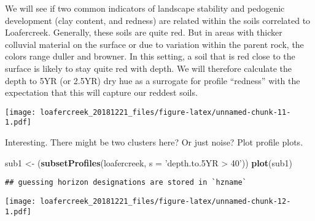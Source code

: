 \documentclass[]{article}
\newenvironment{Shaded}{\begin{snugshade}}{\end{snugshade}}
\newcommand{\KeywordTok}[1]{\textcolor[rgb]{0.13,0.29,0.53}{\textbf{#1}}}
\newcommand{\DataTypeTok}[1]{\textcolor[rgb]{0.13,0.29,0.53}{#1}}
\newcommand{\DecValTok}[1]{\textcolor[rgb]{0.00,0.00,0.81}{#1}}
\newcommand{\StringTok}[1]{\textcolor[rgb]{0.31,0.60,0.02}{#1}}
\newcommand{\OtherTok}[1]{\textcolor[rgb]{0.56,0.35,0.01}{#1}}
\newcommand{\OperatorTok}[1]{\textcolor[rgb]{0.81,0.36,0.00}{\textbf{#1}}}
\newcommand{\NormalTok}[1]{#1}
\begin{document}
We will see if two common indicators of landscape stability and
pedogenic development (clay content, and redness) are related within the
soils correlated to Loafercreek. Generally, these soils are quite red.
But in areas with thicker colluvial material on the surface or due to
variation within the parent rock, the colors range duller and browner.
In this setting, a soil that is red close to the surface is likely to
stay quite red with depth. We will therefore calculate the depth to 5YR
(or 2.5YR) dry hue as a surrogate for profile ``redness'' with the
expectation that this will capture our reddest soils.

\begin{Shaded}
\end{Shaded}

\texttt{[image: loafercreek\_20181221\_files/figure-latex/unnamed-chunk-11-1.pdf]}

Interesting. There might be two clusters here? Or just noise? Plot
profile plots.

\begin{Shaded}
\begin{Highlighting}[]
\NormalTok{sub1 <-}\StringTok{ }\NormalTok{(}\KeywordTok{subsetProfiles}\NormalTok{(loafercreek, }\DataTypeTok{s =} \StringTok{'depth.to.5YR > 40'}\NormalTok{))}
\KeywordTok{plot}\NormalTok{(sub1)}
\end{Highlighting}
\end{Shaded}

\begin{verbatim}
## guessing horizon designations are stored in `hzname`
\end{verbatim}

\texttt{[image: loafercreek\_20181221\_files/figure-latex/unnamed-chunk-12-1.pdf]}
\end{document}
